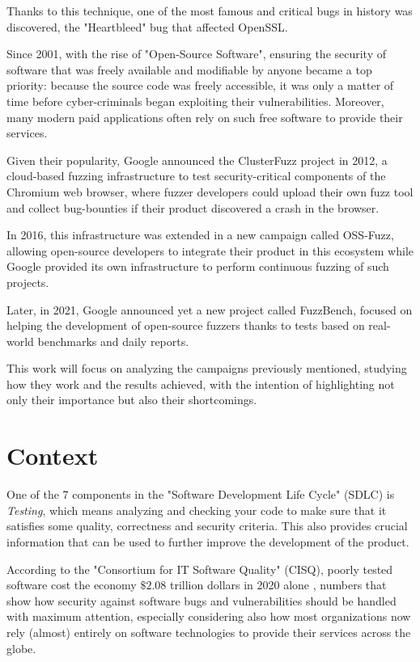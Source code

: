 Thanks to this technique, one of the most famous and critical bugs in history was discovered, the "Heartbleed" bug that affected OpenSSL.

Since 2001, with the rise of "Open-Source Software", ensuring the security of software that was freely available and modifiable by anyone became a top priority: because the source code was freely accessible, it was only a matter of time before cyber-criminals began exploiting their vulnerabilities. Moreover, many modern paid applications often rely on such free software to provide their services. 

Given their popularity, Google announced the ClusterFuzz project in 2012, a cloud-based fuzzing infrastructure to test security-critical components of the Chromium web browser, where fuzzer developers could upload their own fuzz tool and collect bug-bounties if their product discovered a crash in the browser.

In 2016, this infrastructure was extended in a new campaign called OSS-Fuzz, allowing open-source developers to integrate their product in this ecosystem while Google provided its own infrastructure to perform continuous fuzzing of such projects.

Later, in 2021, Google announced yet a new project called FuzzBench, focused on helping the development of open-source fuzzers thanks to tests based on real-world benchmarks and daily reports.

This work will focus on analyzing the campaigns previously mentioned, studying how they work and the results achieved, with the intention of highlighting not only their importance but also their shortcomings.



\section{Context}
One of the 7 components in the "Software Development Life Cycle" (SDLC) is \textit{Testing}, which means analyzing and checking your code to make sure that it satisfies some quality, correctness and security criteria. This also provides crucial information that can be used to further improve the development of the product.

According to the "Consortium for IT Software Quality" (CISQ), poorly tested software cost the economy $\$2.08$ trillion dollars in 2020 alone \cite{forbes}, numbers that show how security against software bugs and vulnerabilities should be handled with maximum attention, especially considering also how most organizations now rely (almost) entirely on software technologies to provide their services across the globe.

